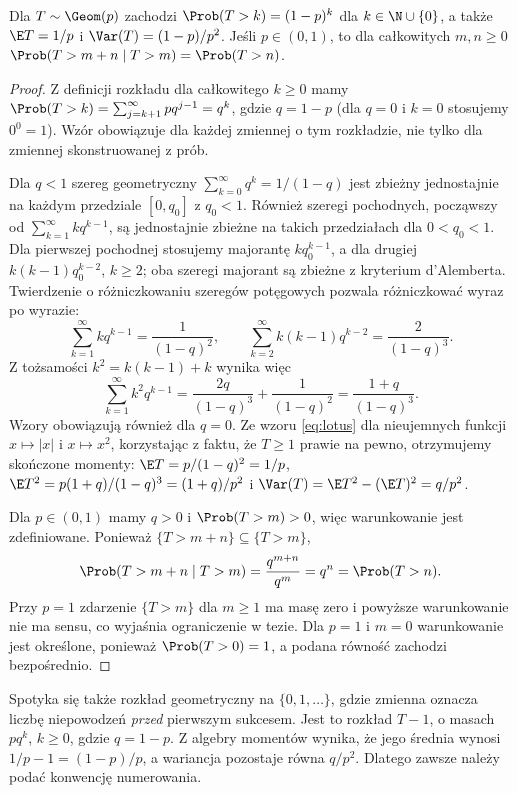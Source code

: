 \begin{stwierdzenie}
Dla $T\sim\Geom(p)$ zachodzi $\Prob(T>k)=(1-p)^k$ dla
$k\in\N\cup\{0\}$, a także
$\E T=1/p$ i $\Var(T)=(1-p)/p^2$.
Jeśli $p\in(0,1)$, to dla całkowitych $m,n\geq0$
$\Prob(T>m+n\mid T>m)=\Prob(T>n)$.
\end{stwierdzenie}
\begin{proof}
Z definicji rozkładu dla całkowitego $k\geq0$ mamy
$\Prob(T>k)=\sum_{j=k+1}^\infty pq^{j-1}=q^k$,
gdzie $q=1-p$ (dla $q=0$ i $k=0$ stosujemy $0^0=1$).
Wzór obowiązuje dla każdej zmiennej o tym rozkładzie,
nie tylko dla zmiennej skonstruowanej z prób.

Dla $q<1$ szereg geometryczny
$\sum_{k=0}^\infty q^k=1/(1-q)$ jest zbieżny
jednostajnie na każdym przedziale $[0,q_0]$ z $q_0<1$.
Również szeregi pochodnych, począwszy od
$\sum_{k=1}^\infty kq^{k-1}$, są jednostajnie zbieżne
na takich przedziałach dla $0<q_0<1$.
Dla pierwszej pochodnej stosujemy majorantę $kq_0^{k-1}$,
a dla drugiej $k(k-1)q_0^{k-2}$, $k\geq2$;
oba szeregi majorant są zbieżne z kryterium d'Alemberta.
Twierdzenie o różniczkowaniu szeregów potęgowych
pozwala różniczkować wyraz po wyrazie:
\[
\sum_{k=1}^\infty kq^{k-1}=\frac1{(1-q)^2},
\qquad
\sum_{k=2}^\infty k(k-1)q^{k-2}=\frac2{(1-q)^3}.
\]
Z tożsamości $k^2=k(k-1)+k$ wynika więc
\[
\sum_{k=1}^\infty k^2q^{k-1}
=\frac{2q}{(1-q)^3}+\frac1{(1-q)^2}
=\frac{1+q}{(1-q)^3}.
\]
Wzory obowiązują również dla $q=0$.
Ze wzoru \eqref{eq:lotus} dla nieujemnych funkcji
$x\mapsto |x|$ i $x\mapsto x^2$, korzystając z faktu,
że $T\geq1$ prawie na pewno, otrzymujemy skończone momenty:
$\E T=p/(1-q)^2=1/p$,
$\E T^2=p(1+q)/(1-q)^3=(1+q)/p^2$
i $\Var(T)=\E T^2-(\E T)^2=q/p^2$.

Dla $p\in(0,1)$ mamy $q>0$ i
$\Prob(T>m)>0$, więc warunkowanie jest zdefiniowane.
Ponieważ $\{T>m+n\}\subseteq\{T>m\}$,
\[
\Prob(T>m+n\mid T>m)
=\frac{q^{m+n}}{q^m}=q^n=\Prob(T>n).
\]
Przy $p=1$ zdarzenie $\{T>m\}$ dla $m\geq1$
ma masę zero i powyższe warunkowanie nie ma sensu,
co wyjaśnia ograniczenie w tezie. Dla $p=1$ i $m=0$
warunkowanie jest określone, ponieważ $\Prob(T>0)=1$,
a podana równość zachodzi bezpośrednio.
\end{proof}

\begin{uwaga}
Spotyka się także rozkład geometryczny na $\{0,1,\ldots\}$,
gdzie zmienna oznacza liczbę niepowodzeń \emph{przed} pierwszym sukcesem.
Jest to rozkład $T-1$, o masach $pq^k$, $k\geq0$,
gdzie $q=1-p$. Z algebry momentów wynika, że jego średnia
wynosi $1/p-1=(1-p)/p$, a wariancja pozostaje równa $q/p^2$.
Dlatego zawsze należy podać konwencję numerowania.
\end{uwaga}

